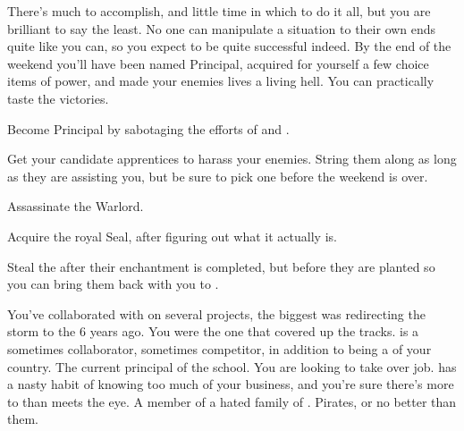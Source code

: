 \documentclass[char]{GL2020}
\begin{document}
There’s much to accomplish, and little time in which to do it all, but you are brilliant to say the least.  No one can manipulate a situation to their own ends quite like you can, so you expect to be quite successful indeed.  By the end of the weekend you’ll have been named Principal, acquired for yourself a few choice items of power, and made your enemies lives a living hell.  You can practically taste the victories.


\begin{itemz}[Goals]
	\item Become Principal by sabotaging the efforts of \cMusic{} and \cBeetle{}.
	\item Get your candidate apprentices to harass your enemies. String them along as long as they are assisting you, but be sure to pick one before the weekend is over.
\item Assassinate the \pShippies{} Warlord.
\item Acquire the \pFarm{} royal Seal, after figuring out what it actually is.
\item Steal the \iMagicBeans{} after their enchantment is completed, but before they are planted so you can bring them back with you to \pFarm{}.
\end{itemz}

\begin{itemz}[Notes]
	\item 
\end{itemz}

\begin{contacts}
	\contact{\cDiplomat{}} You’ve collaborated with \cDiplomat{} on several projects, the biggest was redirecting the storm to the \pShip{} 6 years ago. You were the one that covered up the tracks.
	\contact{\cPrince{}} is a sometimes collaborator, sometimes competitor, in addition to being a \cPrince{\Heir} of your country.
\contact{\cPrincipal{}} The current principal of the school. You are looking to take over \cPrincipal{\their} job.
\contact{\cInterpol{}} has a nasty habit of knowing too much of your business, and you’re sure there’s more to \cInterpol{\them} than meets the eye.
\contact{\cJuniorStatesman{}} A member of a hated family of \pShippies{}. Pirates, or no better than them.
\end{contacts}
\end{document}
